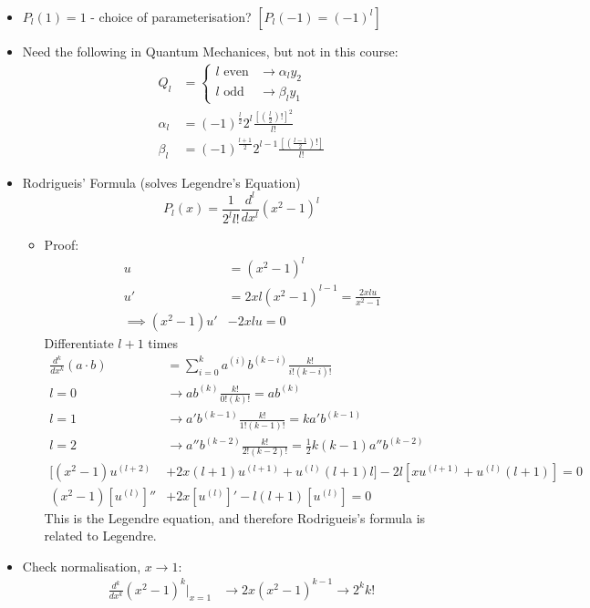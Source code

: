 \documentclass[Maths.tex]{subfiles}
\begin{document}
\begin{itemize}
\begin{itemize}
\begin{equation*}
        \end{equation*}
    \end{itemize}
    \item $P_l(1) = 1$ - choice of parameterisation? $[P_l(-1) = (-1)^l]$
    \item Need the following in Quantum Mechanices, but not in this course:
    \begin{align*}
        Q_l &= \begin{cases} l \text{ even} & \to \alpha_ly_2 \\ l\text{ odd} & \to \beta_ly_1 \end{cases} \\
        \alpha_l &= (-1)^{\frac{l}{2}}2^l \frac{\left[\left(\frac{l}{2}\right)!\right]^2}{l!} \\
        \beta_l &= (-1)^{\frac{l+1}{2}}2^{l-1}\frac{\left[\left(\frac{l-1}{2}\right)!\right]}{l!}
    \end{align*}
    \item Rodrigueis' Formula (solves Legendre's Equation)
    \begin{equation*}
        P_l(x) = \frac{1}{2^l l!}\frac{d^l}{dx^l}(x^2 - 1)^l
    \end{equation*}
    \begin{itemize}
        \item Proof:
        \begin{align*}
            u &= (x^2 - 1)^l \\
            u' &= 2xl(x^2 - 1)^{l-1} = \frac{2xlu}{x^2 - 1} \\
            \implies (x^2 - 1)u' &- 2xlu = 0
        \end{align*}
        Differentiate $l+1$ times
        \begin{align*}
            \frac{d^k}{dx^k} (a\cdot b) &= \sum_{i=0}^k a^{(i)}b^{(k-i)}\frac{k!}{i!(k-i)!} \\
            l = 0 &\to ab^{(k)}\frac{k!}{0!(k)!} = ab^{(k)} \\
            l = 1 &\to a'b^{(k-1)}\frac{k!}{1!(k-1)!} = ka'b^{(k-1)} \\
            l = 2 &\to a''b^{(k-2)}\frac{k!}{2!(k-2)!} = \frac{1}{2}k(k-1)a''b^{(k-2)} \\
            [(x^2 -1)u^{(l+2)} &+ 2x(l+1)u^{(l+1)} + u^{(l)}(l+1)l] - 2l[xu^{(l+1)} + u^{(l)}(l+1)] = 0 \\
            (x^2 - 1)[u^{(l)}]'' &+ 2x[u^{(l)}]' - l(l+1)[u^{(l)}] = 0
        \end{align*}
        This is the Legendre equation, and therefore Rodrigueis's formula is related to Legendre.
    \end{itemize}
    \item Check normalisation, $x\to1$:
    \begin{align*}
        \frac{d^k}{dx^k} (x^2 - 1)^k\Big|_{x=1} &\to 2x(x^2 - 1)^{k-1} \to 2^kk!
    \end{align*}
\end{itemize}
\end{document}
